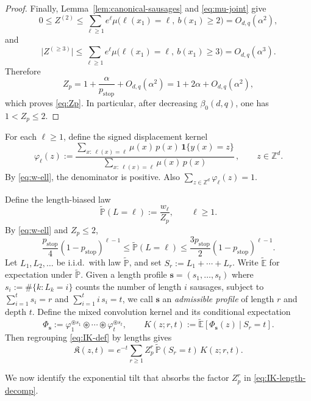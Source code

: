 \documentclass[letterpaper,11pt,reqno]{amsart}
\theoremstyle{definition}
\newcommand{\conv}{\circledast}
\newcommand{\IK}{\mathfrak{K}}
\newcommand{\vs}{\mathbf{s}}\newcommand{\vt}{\mathbf{t}}\newcommand{\vu}{\mathbf{u}}
\begin{document}
\begin{proof}
Finally, Lemma~\ref{lem:canonical-sausages} and
\eqref{eq:mu-joint} give
\[
0\le Z^{(2)}
\le
\sum_{\ell\ge1}e^\ell
\mu\bigl(\ell(x_1)=\ell,\ b(x_1)\ge2\bigr)
=
O_{d,q}(\alpha^2),
\]
and
\[
\bigl|Z^{(\ge3)}\bigr|
\le
\sum_{\ell\ge1}e^\ell
\mu\bigl(\ell(x_1)=\ell,\ b(x_1)\ge3\bigr)
=
O_{d,q}(\alpha^3).
\]
Therefore
\[
Z_p
=
1+\frac{\alpha}{p_{\mathrm{stop}}}
+O_{d,q}(\alpha^2)
=
1+2\alpha+O_{d,q}(\alpha^2),
\]
which proves \eqref{eq:Zp}. In particular, after decreasing
\(\beta_0(d,q)\), one has \(1<Z_p\le2\).
\end{proof}



For each \(\ell\ge1\), define the signed displacement kernel
\begin{equation*}
\varphi_\ell(z):=\frac{\sum_{x:\ \ell(x)=\ell}\mu(x)\,p(x)\,\mathbf 1\{y(x)=z\}}
{\sum_{x:\ \ell(x)=\ell}\mu(x)\,p(x)}\,,
\qquad z\in\mathbb Z^d.
\end{equation*}
By \eqref{eq:w-ell}, the denominator is positive. Also $\sum_{z\in\mathbb{Z}^d}\varphi_\ell(z)=1$.

Define the length-biased law
\[
\tilde{\mathbb P}(L=\ell):=\frac{w_\ell}{Z_p},
\qquad \ell\ge1.
\]
By \eqref{eq:w-ell} and \(Z_p\le2\),
\begin{equation}\label{eq:L-tilde-bound}
\frac{p_{\mathrm{stop}}}{4}(1-p_{\mathrm{stop}})^{\ell-1}
\le
\tilde{\mathbb P}(L=\ell)
\le
\frac{3p_{\mathrm{stop}}}{2}(1-p_{\mathrm{stop}})^{\ell-1}.
\end{equation}
Let \(L_1,L_2,\dots\) be i.i.d.\ with law \(\tilde{\mathbb P}\), and set \(S_r:=L_1+\cdots+L_r\). Write $\tilde{\mathbb E}$ for expectation under $\tilde{\mathbb P}$.
Given a length profile $\vs=(s_1,\dots,s_t)$ where $s_i:=\#\{k:L_k=i\}$ counts the number of length $i$ sausages,
subject to
$\sum_{i=1}^t s_i=r$ and $\sum_{i=1}^t i\,s_i=t$,
we call \(\vs\) an \emph{admissible profile} of length \(r\) and depth \(t\).
Define the mixed convolution kernel and its conditional expectation
\[
\Phi_{\vs}
:=\varphi_1^{\conv s_1}\conv\cdots\conv \varphi_t^{\conv s_t},
\qquad
K(z;r,t):=\tilde{\mathbb E}\!\left[\Phi_{\mathbf s}(z)\ \big|\ S_r=t\right].
\]
Then regrouping \eqref{eq:IK-def} by lengths gives
\begin{equation}\label{eq:IK-length-decomp}
\IK(z,t)=e^{-t}\sum_{r\ge1}Z_p^r\,\tilde{\mathbb P}(S_r=t)\,K(z;r,t).
\end{equation}

We now identify the exponential tilt that absorbs the factor \(Z_p^r\)
in \eqref{eq:IK-length-decomp}.
\end{document}

